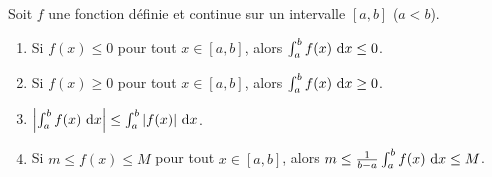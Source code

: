 	      \begin{prop}
	            Soit $f$ une fonction d\'efinie et continue sur un intervalle $[a,b]$ ($a<b$).
	            \begin{enumerate}
	                  \item Si $ f(x) \leq 0$ pour tout $x\in [a,b]$, alors $\int_{a}^{b} f(x) ~\mathrm{d}x \leq 0$.
	                  \item Si $ f(x) \geq 0$ pour tout $ x\in [a,b]$, alors $\int_{a}^{b} f(x) ~\mathrm{d}x \geq 0$.
	                  \item $ \left\lvert \int_{a}^{b} f(x) ~\mathrm{d}x \right\rvert \leq \int_{a}^{b} |f(x)| ~\mathrm{d}x $.
	                  \item Si $m\leq f(x) \leq M$ pour tout $x\in [a,b]$, 
	                        alors $ m \leq \frac{1}{b-a} \int_{a}^{b} f(x) ~\mathrm{d}x \leq M$.
	            \end{enumerate}
	      \end{prop}

